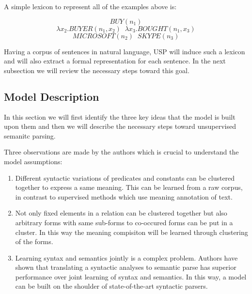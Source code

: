 \documentclass[12pt]{report}
\begin{document}
   A simple lexicon to represent all of the examples above is:
  
   $$ BUY(n_1)$$
   $$ \lambda x_2.BUYER(n_1 , x_2) \; \;  \lambda x_3.BOUGHT(n_1 , x_3) $$
   $$ MICROSOFT(n_2) \; \; SKYPE(n_3)$$
   
   Having a corpus of sentences in natural language, USP \cite{Poon2009}
    will induce such a lexicon and will also extract a formal representation for each sentence. In the next 
    subsection we will review the necessary steps toward this goal.
\subsection{Model Description}
\label{ch:model}
In this section we will first identify the three key ideas that the model is built upon them and then 
we will describe the necessary steps toward unsupervised semanitc parsing.

Three observations are made by the authors which is crucial to understand the model assumptions:

\begin{enumerate}
  \item Different syntactic variations of predicates and constants can be clustered together to express
   a same meaning. This can be learned from a raw corpus, in contrast to supervised methods which use meaning annotation of text.
   \item Not only fixed elements in a relation can be clustered together but also arbitrary forms with same sub-forms to co-occured forms 
   can be put in a cluster. In this way the meaning compisiton will be learned through clustering of the forms.
   \item Learning syntax and semantics jointly is a complex problem. Authors have shown that translating a syntactic analyses
   to semantic parse has superior performance over joint learning of syntax and semantics. In this way, a model can be built on the shoulder
   of state-of-the-art syntactic parsers.
   
\end{enumerate}
\end{document}
